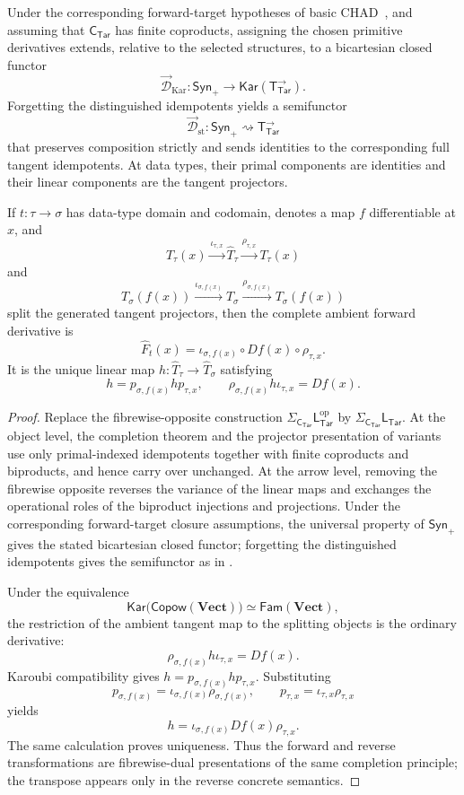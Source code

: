 \documentclass[runningheads,envcountsame]{llncs}
\newcommand{\Vect}{\mathbf{Vect}}
\newcommand{\Synp}{\mathsf{Syn}_{+}}
\newcommand{\Tar}{\mathsf{Tar}}
\newcommand{\CTar}{\mathsf C_{\Tar}}
\newcommand{\LTar}{\mathsf L_{\Tar}}
\newcommand{\Copow}{\mathsf{Copow}}
\newcommand{\Fam}{\mathsf{Fam}}
\newcommand{\Kar}{\mathsf{Kar}}
\newcommand{\TotTarFwd}{\mathsf T_{\Tar}^{\rightarrow}}
\newcommand{\DFKar}{\overrightarrow{\mathcal D}_{\mathrm{Kar}}}
\newcommand{\DFst}{\overrightarrow{\mathcal D}_{\mathrm{st}}}
\newcommand{\semiarrow}{\rightsquigarrow}
\begin{document}
\begin{corollary}
\label{thm:forward-app}
Under the corresponding forward-target hypotheses of basic CHAD~\cite[Theorem~6.1]{VakarSmeding2022}, and assuming that $\CTar$ has finite coproducts, assigning the chosen primitive derivatives extends, relative to the selected structures, to a bicartesian closed functor
$$
\DFKar:\Synp\longrightarrow\Kar(\TotTarFwd).
$$
Forgetting the distinguished idempotents yields a semifunctor
$$
\DFst:\Synp\semiarrow\TotTarFwd
$$
that preserves composition strictly and sends identities to the corresponding full tangent idempotents. At data types, their primal components are identities and their linear components are the tangent projectors.

If $t:\tau\to\sigma$ has data-type domain and codomain, denotes a map $f$
differentiable at $x$, and
$$
T_\tau(x)
\xrightarrow{\iota_{\tau,x}}
\widehat T_\tau
\xrightarrow{\rho_{\tau,x}}
T_\tau(x)
$$
and
$$
T_\sigma(f(x))
\xrightarrow{\iota_{\sigma,f(x)}}
\widehat T_\sigma
\xrightarrow{\rho_{\sigma,f(x)}}
T_\sigma(f(x))
$$
split the generated tangent projectors, then the complete ambient forward derivative is
$$
\widehat F_t(x)
=
\iota_{\sigma,f(x)}
\circ Df(x)
\circ\rho_{\tau,x}.
$$
It is the unique linear map $h:\widehat T_\tau\to\widehat T_\sigma$ satisfying
$$
h=p_{\sigma,f(x)}hp_{\tau,x},
\qquad
\rho_{\sigma,f(x)}h\iota_{\tau,x}=Df(x).
$$
\end{corollary}

\begin{proof}
Replace the fibrewise-opposite construction $\Sigma_{\CTar}\LTar^{\mathrm{op}}$ by $\Sigma_{\CTar}\LTar$. At the object level, the completion theorem and the projector presentation of variants use only primal-indexed idempotents together with finite coproducts and biproducts, and hence carry over unchanged. At the arrow level, removing the fibrewise opposite reverses the variance of the linear maps and exchanges the operational roles of the biproduct injections and projections. Under the corresponding forward-target closure assumptions, the universal property of $\Synp$ gives the stated bicartesian closed functor; forgetting the distinguished idempotents gives the semifunctor as in .

Under the equivalence
$$
\Kar\bigl(\Copow(\Vect)\bigr)
\simeq
\Fam(\Vect),
$$
the restriction of the ambient tangent map to the splitting objects is the ordinary derivative:
$$
\rho_{\sigma,f(x)}h\iota_{\tau,x}=Df(x).
$$
Karoubi compatibility gives $h=p_{\sigma,f(x)}hp_{\tau,x}$. Substituting
$$
p_{\sigma,f(x)}
=
\iota_{\sigma,f(x)}\rho_{\sigma,f(x)},
\qquad
p_{\tau,x}
=
\iota_{\tau,x}\rho_{\tau,x}
$$
yields
$$
h
=
\iota_{\sigma,f(x)}
Df(x)
\rho_{\tau,x}.
$$
The same calculation proves uniqueness. Thus the forward and reverse transformations are fibrewise-dual presentations of the same completion principle; the transpose appears only in the reverse concrete semantics.
\end{proof}
\end{document}
